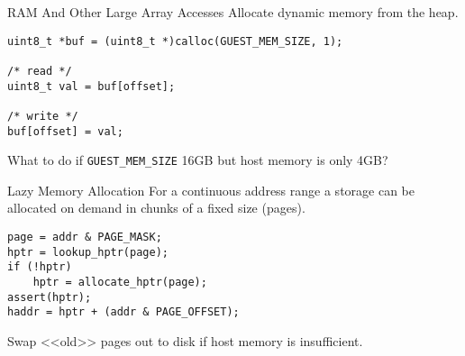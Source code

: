\begin{frame}[fragile]{RAM And Other Large Array Accesses}
Allocate dynamic memory from the heap.
\vfill
\begin{lstlisting}
uint8_t *buf = (uint8_t *)calloc(GUEST_MEM_SIZE, 1);

/* read */
uint8_t val = buf[offset];

/* write */
buf[offset] = val;
\end{lstlisting}
\vfill\pause
What to do if \texttt{GUEST_MEM_SIZE} 16GB but host memory is only 4GB?
\end{frame}

\begin{frame}[fragile]{Lazy Memory Allocation}
For a continuous address range a storage can be allocated on demand in chunks
of a fixed size (pages).
\vfill
\begin{lstlisting}
page = addr & PAGE_MASK;
hptr = lookup_hptr(page);
if (!hptr)
    hptr = allocate_hptr(page);
assert(hptr);
haddr = hptr + (addr & PAGE_OFFSET);
\end{lstlisting}
\vfill
Swap <<old>> pages out to disk if host memory is insufficient.
\end{frame}

